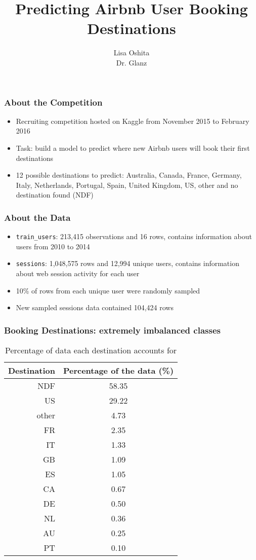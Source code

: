 \documentclass{beamer}
\title{Predicting Airbnb User Booking Destinations}
\author{Lisa Oshita\\Dr. Glanz}
\begin{document}
 
\frame{\titlepage}

\begin{frame}
\frametitle{About the Competition}
  \begin{itemize}
    \item Recruiting competition hosted on Kaggle from November 2015 to February 2016
    \item Task: build a model to predict where new Airbnb users will book their first destinations
    \item 12 possible destinations to predict: Australia, Canada, France, Germany, Italy, Netherlands, Portugal, Spain, United Kingdom, US, other and no destination found (NDF)
  \end{itemize}
\end{frame}

\begin{frame}
\frametitle{About the Data}
\begin{itemize}
  \item \texttt{train\_users}: 213,415 observations and 16 rows, contains information about users from 2010 to 2014
  \item \texttt{sessions}: 1,048,575 rows and 12,994 unique users, contains information about web session activity for each user
  \item 10\% of rows from each unique user were randomly sampled
  \item New sampled sessions data contained 104,424 rows
\end{itemize}
\end{frame}

\begin{frame}
\frametitle{Booking Destinations: extremely imbalanced classes}
\begin{table}[ht]
\centering
\begin{tabular}{| r |c |}
  \hline
  \textbf{Destination} & \textbf{Percentage of the data (\%)} \\ 
  \hline
  NDF & 58.35 \\ 
  US & 29.22 \\ 
  other & 4.73 \\ 
  FR & 2.35 \\ 
  IT & 1.33 \\ 
  GB & 1.09 \\ 
  ES & 1.05 \\ 
  CA & 0.67 \\ 
  DE & 0.50 \\ 
  NL & 0.36 \\ 
  AU & 0.25 \\ 
  PT & 0.10 \\ 
   \hline
\end{tabular}
\caption{Percentage of data each destination accounts for}
\label{table:countries}
\end{table}
\end{frame}
\end{document}
